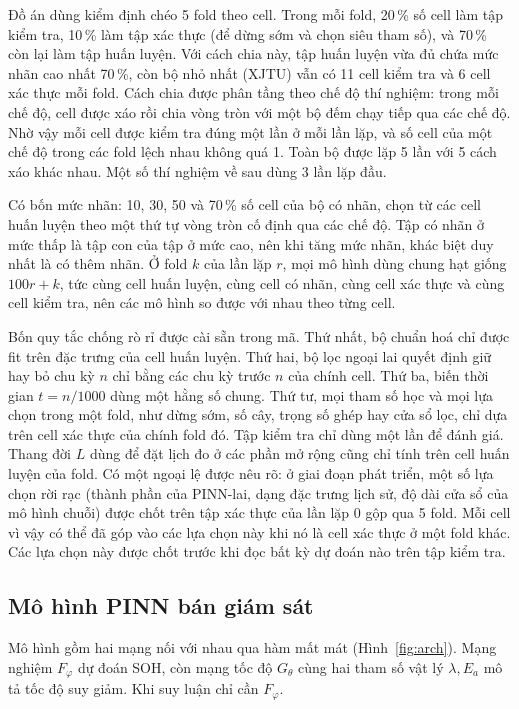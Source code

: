 Đồ án dùng kiểm định chéo 5 fold theo cell. Trong mỗi fold, 20\,\% số cell làm tập kiểm tra, 10\,\% làm tập xác thực (để
dừng sớm và chọn siêu tham số), và 70\,\% còn lại làm tập huấn luyện. Với cách chia này, tập huấn luyện vừa đủ chứa mức
nhãn cao nhất 70\,\%, còn bộ nhỏ nhất (XJTU) vẫn có 11 cell kiểm tra và 6 cell xác thực mỗi fold. Cách chia được phân tầng
theo chế độ thí nghiệm: trong mỗi chế độ, cell được xáo rồi chia vòng tròn với một bộ đếm chạy tiếp qua các chế độ. Nhờ
vậy mỗi cell được kiểm tra đúng một lần ở mỗi lần lặp, và số cell của một chế độ trong các fold lệch nhau không quá 1.
Toàn bộ được lặp 5 lần với 5 cách xáo khác nhau. Một số thí nghiệm về sau dùng 3 lần lặp đầu.

Có bốn mức nhãn: 10, 30, 50 và 70\,\% số cell của bộ có nhãn, chọn từ các cell huấn luyện theo một thứ tự vòng tròn cố
định qua các chế độ. Tập có nhãn ở mức thấp là tập con của tập ở mức cao, nên khi tăng mức nhãn, khác biệt duy nhất là có
thêm nhãn. Ở fold $k$ của lần lặp $r$, mọi mô hình dùng chung hạt giống $100r + k$, tức cùng cell huấn luyện, cùng cell
có nhãn, cùng cell xác thực và cùng cell kiểm tra, nên các mô hình so được với nhau theo từng cell.

Bốn quy tắc chống rò rỉ được cài sẵn trong mã. Thứ nhất, bộ chuẩn hoá chỉ được fit trên đặc trưng của cell huấn luyện.
Thứ hai, bộ lọc ngoại lai quyết định giữ hay bỏ chu kỳ $n$ chỉ bằng các chu kỳ trước $n$ của chính cell. Thứ ba, biến
thời gian $t = n/1000$ dùng một hằng số chung. Thứ tư, mọi tham số học và mọi lựa chọn trong một fold, như dừng sớm, số
cây, trọng số ghép hay cửa sổ lọc, chỉ dựa trên cell xác thực của chính fold đó. Tập kiểm tra chỉ dùng một lần để đánh
giá. Thang đời $L$ dùng để đặt lịch đo ở các phần mở rộng cũng chỉ tính trên cell huấn luyện của fold. Có một ngoại lệ
được nêu rõ: ở giai đoạn phát triển, một số lựa chọn rời rạc (thành phần của PINN-lai, dạng đặc trưng lịch sử, độ dài cửa
sổ của mô hình chuỗi) được chốt trên tập xác thực của lần lặp 0 gộp qua 5 fold. Mỗi cell vì vậy có thể đã góp vào các lựa
chọn này khi nó là cell xác thực ở một fold khác. Các lựa chọn này được chốt trước khi đọc bất kỳ dự đoán nào trên tập
kiểm tra.

\subsection{Mô hình PINN bán giám sát}\label{sec:pinn}

Mô hình gồm hai mạng nối với nhau qua hàm mất mát (Hình~\ref{fig:arch}). Mạng nghiệm $F_\varphi$ dự đoán SOH, còn mạng
tốc độ $G_\theta$ cùng hai tham số vật lý $\lambda, E_a$ mô tả tốc độ suy giảm. Khi suy luận chỉ cần $F_\varphi$.

